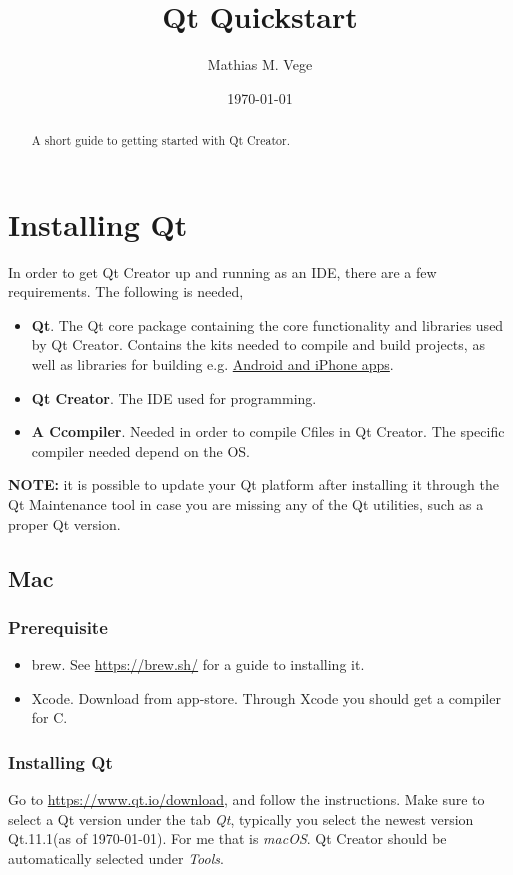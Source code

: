 \documentclass[11pt]{article}
\title{Qt Quickstart}
\author{Mathias M. Vege}
\date{\today}
\newcommand{\CC}{C\nolinebreak\hspace{-.05em}\raisebox{.4ex}{\tiny\bf +}\nolinebreak\hspace{-.10em}\raisebox{.4ex}{\tiny\bf +}}
\def\CC{{C\nolinebreak[4]\hspace{-.05em}\raisebox{.4ex}{\tiny\bf ++}}}
\begin{document}
\maketitle

\begin{abstract}
A short guide to getting started with Qt Creator.
\end{abstract}

\tableofcontents

\section{Installing Qt} \label{section:installing-qt}
In order to get Qt Creator up and running as an IDE, there are a few requirements. The following is needed,
\begin{itemize}
    \item \textbf{Qt}. The Qt core package containing the core functionality and libraries used by Qt Creator. Contains the kits needed to compile and build projects, as well as libraries for building e.g. \href{http://doc.qt.io/qt-5/ios-support.html}{Android and iPhone apps}.
    \item \textbf{Qt Creator}. The IDE used for programming.
    \item \textbf{A \CC compiler}. Needed in order to compile \CC  files in Qt Creator. The specific compiler needed depend on the OS.
\end{itemize}

\textbf{NOTE:} it is possible to update your Qt platform after installing it through the Qt Maintenance tool in case you are missing any of the Qt utilities, such as a proper Qt version. 

\subsection{Mac}
\subsubsection{Prerequisite}
\begin{itemize}
    \item brew. See \url{https://brew.sh/} for a guide to installing it.
    \item Xcode. Download from app-store. Through Xcode you should get a compiler for \CC.
\end{itemize}
\subsubsection{Installing Qt}
Go to \url{https://www.qt.io/download}, and follow the instructions. Make sure to select a Qt version under the tab \emph{Qt}, typically you select the newest version Qt.11.1(as of \today). For me that is \emph{macOS}. Qt Creator should be automatically selected under \emph{Tools}.
\end{document}
